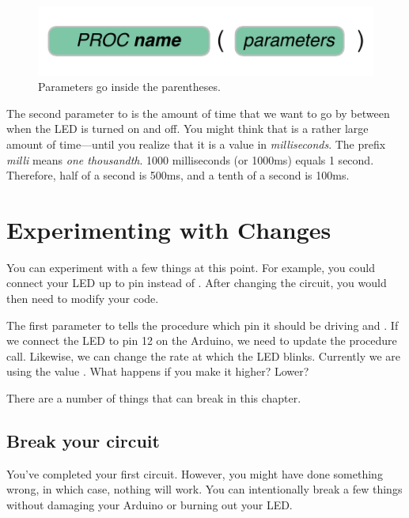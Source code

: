 \begin{figure}[h!]
  \begin{center}
    \includegraphics[width=\linewidth]{images/ch1-proc-call-pattern}
    \caption{Parameters go inside the parentheses.}
    \label{pattern:ch2-parameters}
  \end{center}
\end{figure}


The second parameter to \blink is the amount of time that we want to go by between when the LED is turned on and off. You might think that {} is a rather large amount of time---until you realize that it is a value in {\em milliseconds}. The prefix {\em milli} means {\em one thousandth}. 1000 milliseconds (or 1000ms) equals 1 second. Therefore, half of a second is 500ms, and a tenth of a second is 100ms. 

\newpage

\section{Experimenting with Changes}
You can experiment with a few things at this point. For example, you could connect your LED up to pin {} instead of \chtwopin. After changing the circuit, you would then need to modify your code.

\vspace{3mm}



The first parameter to \blink tells the procedure which pin it should be driving \HIGH and \LOW. If we connect the LED to pin 12 on the Arduino, we need to update the procedure call. Likewise, we can change the rate at which the LED blinks. Currently we are using the value {}. What happens if you make it higher? Lower?

\BREAKAGE
There are a number of things that can break in this chapter.

\subsection{Break your circuit}
You've completed your first circuit. However, you might have done something wrong, in which case, nothing will work. You can intentionally break a few things without damaging your Arduino or burning out your LED.

